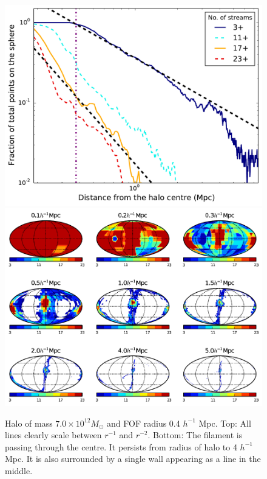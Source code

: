 \begin{figure}
\begin{minipage}[t]{.99\linewidth}
  \centering\includegraphics[width=10.cm]{Chapter3/Source_v2/fig9a}
\includegraphics[width=10.cm]{Chapter3/Source_v2/fig9b} 
\end{minipage}\hfill
\caption{Halo of mass $7.0 \times 10^{12} M_{\odot} $  and  FOF radius 0.4 $h^{-1}$ Mpc. Top: All lines clearly scale between $r^{-1}$ and $r^{-2}$. Bottom: The filament is passing through the centre. It persists from radius of halo to 4 $h^{-1}$ Mpc. It is also surrounded by a single wall appearing as a line in the middle.}
\label{fig:706}
\end{figure}



